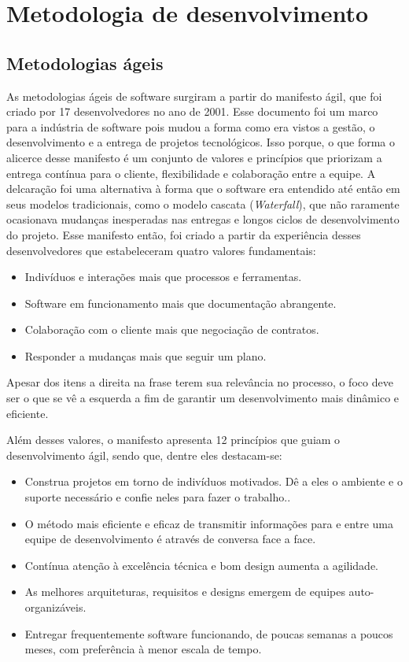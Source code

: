 \section{Metodologia de desenvolvimento}
\subsection{Metodologias ágeis}
As metodologias ágeis de software surgiram a partir do manifesto ágil, que foi criado por 17 desenvolvedores no ano de 2001. Esse documento foi um marco para a indústria de software pois mudou a forma como era vistos a gestão, o desenvolvimento e a entrega de projetos tecnológicos. Isso porque, o que forma o alicerce desse manifesto é
um conjunto de valores e princípios que priorizam a entrega contínua para o cliente, flexibilidade e colaboração entre a equipe. A delcaração foi uma alternativa à forma que o software era entendido até então em seus modelos tradicionais, como o modelo cascata (\textit{Waterfall}), que não raramente ocasionava mudanças inesperadas nas entregas e longos ciclos de desenvolvimento do projeto. Esse manifesto então, foi criado a partir da experiência desses desenvolvedores que estabeleceram quatro valores fundamentais: 

\begin{itemize}
    \item Indivíduos e interações mais que processos e ferramentas.
    \item Software em funcionamento mais que documentação abrangente.
    \item Colaboração com o cliente mais que negociação de contratos.
    \item Responder a mudanças mais que seguir um plano.
\end{itemize}

Apesar dos itens a direita na frase terem sua relevância no processo, o foco deve ser o que se vê a esquerda a fim de garantir um desenvolvimento mais dinâmico e eficiente.

Além desses valores, o manifesto apresenta 12 princípios que guiam o desenvolvimento ágil, sendo que, dentre eles destacam-se:

\begin{itemize}
    \item Construa projetos em torno de indivíduos motivados. Dê a eles o ambiente e o suporte necessário e confie neles para fazer o trabalho..
    \item O método mais eficiente e eficaz de transmitir informações para e entre uma equipe de desenvolvimento é através de conversa face a face.
    \item Contínua atenção à excelência técnica e bom design aumenta a agilidade.
    \item As melhores arquiteturas, requisitos e designs emergem de equipes auto-organizáveis.
    \item Entregar frequentemente software funcionando, de poucas semanas a poucos meses, com preferência à menor escala de tempo.
\end{itemize}

